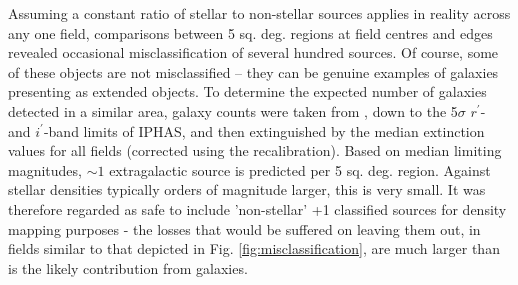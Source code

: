 \documentclass[a4paper,useAMS,usenatbib]{mn2e}
\begin{document}
Assuming a constant ratio of stellar to non-stellar sources applies in reality across 
any one field, comparisons between 5 sq. deg. regions at field centres and edges revealed
occasional misclassification of several hundred sources. Of course, some of these objects 
are not misclassified -- they can be genuine examples of galaxies presenting as extended objects.  
To determine the expected number of galaxies detected in a similar area, galaxy counts were 
taken from \citet{Yasuda2001}, down to the 5$\sigma$ $r^{\prime}$- and $i^{\prime}$-band limits 
of IPHAS, and then extinguished by the median \citet{Schlegel1998} extinction values for all fields 
(corrected using the \citet{Schlafly2011} recalibration). Based on median limiting magnitudes, 
$\sim 1$ extragalactic source is predicted per 5 sq. deg. region. Against stellar densities typically 
orders of magnitude larger, this is very small.  It was therefore regarded as safe to include 
'non-stellar' +1 classified sources for density mapping purposes - the losses that would be 
suffered on leaving them out, in fields similar to that depicted in Fig. \ref{fig:misclassification}, 
are much larger than is the likely contribution from galaxies.


\end{document}
